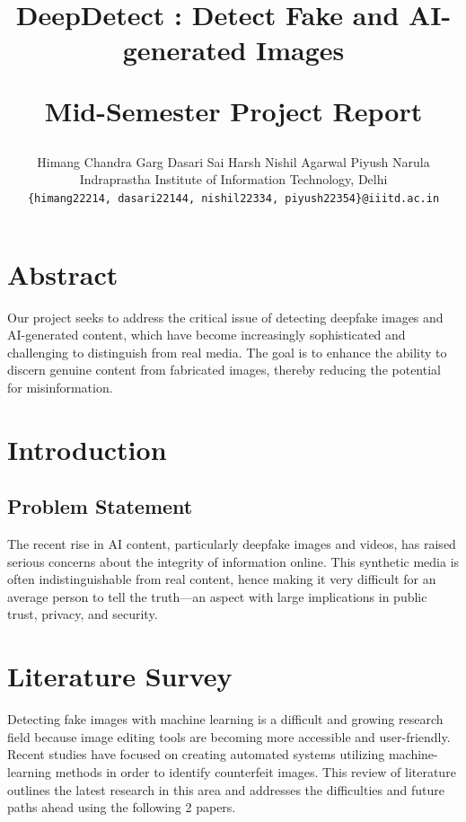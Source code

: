 \documentclass[10pt,twocolumn,letterpaper]{article}
\begin{document}
\title{\begin{center}
    \vspace{-1.75cm}
    DeepDetect : Detect Fake and AI-generated Images
\end{center}
Mid-Semester Project Report}

\author{Himang Chandra Garg \qquad Dasari Sai Harsh \qquad Nishil Agarwal \qquad Piyush Narula\\
Indraprastha Institute of Information Technology, Delhi\\
{\tt\small \{himang22214, dasari22144, nishil22334, piyush22354\}@iiitd.ac.in}
}

\maketitle

\pagestyle{empty}


\section{Abstract}

Our project seeks to address the critical issue of detecting deepfake images and AI-generated content, which have become increasingly sophisticated and challenging to distinguish from real media. 
The goal is to enhance the ability to discern genuine content from fabricated images, thereby reducing the potential for misinformation.

\section{Introduction}

\subsection{Problem Statement}

The recent rise in AI content, particularly deepfake images and videos, has raised serious concerns about the integrity of information online. 
This synthetic media is often indistinguishable from real content, hence making it very difficult for an average person to tell the truth—an aspect with large implications in public trust, privacy, and security.

\section{Literature Survey}
Detecting fake images with machine learning is a difficult and growing research field because image editing tools are becoming more accessible and user-friendly. Recent studies have focused on creating automated systems utilizing machine-learning methods in order to identify counterfeit images. This review of literature outlines the latest research in this area and addresses the difficulties and future paths ahead using the following 2 papers.
\end{document}
